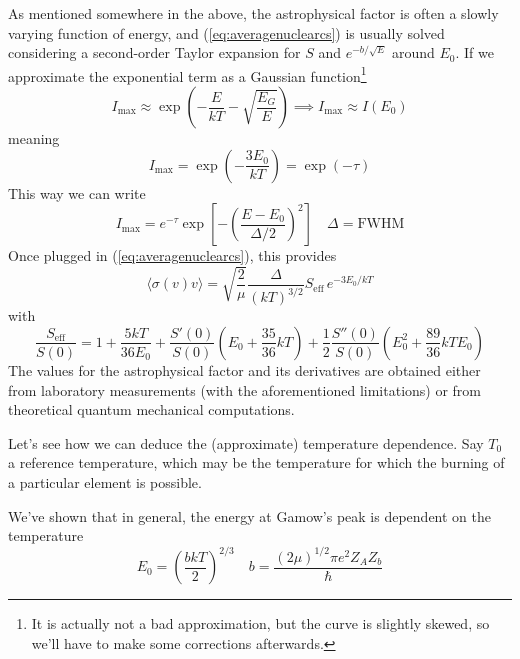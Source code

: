 \par As mentioned somewhere in the above, the astrophysical factor is often a slowly varying function of energy, and (\ref{eq:averagenuclearcs}) is usually solved considering a second-order Taylor expansion for $S$ and $e^{-b/\sqrt{E}}$ around $E_{0}$. If we approximate the exponential term as a Gaussian function\footnote{It is actually not a bad approximation, but the curve is slightly skewed, so we'll have to make some corrections afterwards.} 
\begin{equation*}
    I_{\text{max}} \approx \exp\left(-\frac{E}{kT}-\sqrt{\frac{E_{G}}{E}}\right) \implies I_{\text{max}} \approx I(E_{0})
\end{equation*}
meaning 
\begin{equation*}
    I_{\text{max}} = \exp\left(-\frac{3E_{0}}{kT}\right) = \exp(-\tau)
\end{equation*}
This way we can write 
\begin{equation*}
    I_{\text{max}} = e^{-\tau}\exp\left[-\left(\frac{E-E_{0}}{\Delta/2}\right)^{2}\right] \quad \Delta = \text{FWHM}
\end{equation*}
Once plugged in (\ref{eq:averagenuclearcs}), this provides 
\begin{equation}
    \langle \sigma(v)v \rangle = \sqrt{\frac{2}{\mu}}\frac{\Delta}{(kT)^{3/2}}S_{\text{eff}}\,e^{-3E_{0}/kT}
    \label{eq:approximatenuclearrt}
\end{equation}
with 
\begin{equation}
    \frac{S_{\text{eff}}}{S(0)} = 1+\frac{5kT}{36E_{0}}+\frac{S'(0)}{S(0)}\left(E_{0}+\frac{35}{36}kT\right)+\frac{1}{2}\frac{S''(0)}{S(0)}\left(E_{0}^{2}+\frac{89}{36}kTE_{0}\right)
    \label{eq:effectiveastrofactor}
\end{equation}
The values for the astrophysical factor and its derivatives are obtained either from laboratory measurements (with the aforementioned limitations) or from theoretical quantum mechanical computations.
\par Let's see how we can deduce the (approximate) temperature dependence. Say $T_{0}$ a reference temperature, which may be the temperature for which the burning of a particular element is possible.
\par We've shown that in general, the energy at Gamow's peak is dependent on the temperature 
\begin{equation*}
    E_{0} = \left(\frac{bkT}{2}\right)^{2/3} \quad b = \frac{(2\mu)^{1/2}\pi e^{2}Z_{A}Z_{b}}{\hbar}
\end{equation*}
